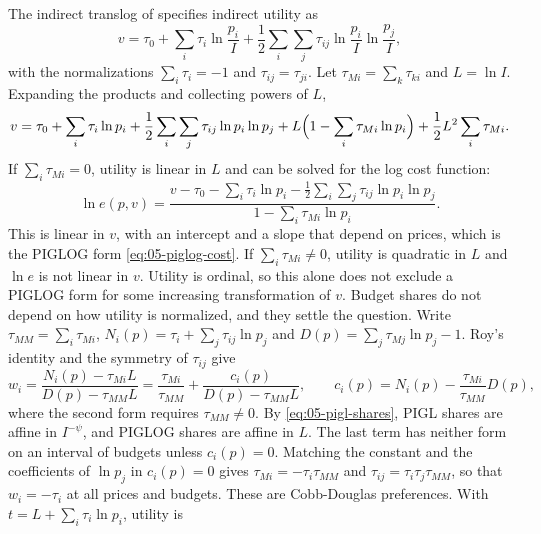 \begin{remark}\label{rem:05-translog-piglog}
The indirect translog of \citet{ChristensenJorgensonLau1975} specifies indirect utility as
\begin{equation*}
  v = \tau_0 + \sum_i \tau_i \ln\frac{p_i}{I}
      + \frac{1}{2}\sum_i\sum_j \tau_{ij}\ln\frac{p_i}{I}\ln\frac{p_j}{I},
\end{equation*}
with the normalizations $\sum_i \tau_i = -1$ and $\tau_{ij} = \tau_{ji}$. Let $\tau_{Mi} = \sum_k
\tau_{ki}$ and $L = \ln I$. Expanding the products and collecting powers of $L$,
\begin{equation*}
  v = \tau_0 + \sum_i \tau_i \ln p_i + \frac{1}{2}\sum_i\sum_j \tau_{ij}\ln p_i \ln p_j
      + L\Bigl(1 - \sum_i \tau_{Mi}\ln p_i\Bigr) + \frac{1}{2}L^2 \sum_i \tau_{Mi} .
\end{equation*}
If $\sum_i \tau_{Mi} = 0$, utility is linear in $L$ and can be solved for the log cost function:
\begin{equation*}
  \ln e(p, v) = \frac{v - \tau_0 - \sum_i \tau_i \ln p_i - \frac{1}{2}\sum_i\sum_j\tau_{ij}\ln p_i\ln p_j}
                     {1 - \sum_i \tau_{Mi}\ln p_i} .
\end{equation*}
This is linear in $v$, with an intercept and a slope that depend on prices, which is the PIGLOG form
\eqref{eq:05-piglog-cost}. If $\sum_i\tau_{Mi} \neq 0$, utility is quadratic in $L$ and $\ln e$ is not
linear in $v$. Utility is ordinal, so this alone does not exclude a PIGLOG form for some increasing
transformation of $v$. Budget shares do not depend on how utility is normalized, and they settle the
question. Write $\tau_{MM} = \sum_i\tau_{Mi}$, $N_i(p) = \tau_i + \sum_j\tau_{ij}\ln p_j$ and $D(p) =
\sum_j\tau_{Mj}\ln p_j - 1$. Roy's identity and the symmetry of $\tau_{ij}$ give
\begin{equation*}
  w_i = \frac{N_i(p) - \tau_{Mi}L}{D(p) - \tau_{MM}L}
      = \frac{\tau_{Mi}}{\tau_{MM}} + \frac{c_i(p)}{D(p) - \tau_{MM}L},
  \qquad c_i(p) = N_i(p) - \frac{\tau_{Mi}}{\tau_{MM}}D(p),
\end{equation*}
where the second form requires $\tau_{MM} \neq 0$. By \eqref{eq:05-pigl-shares}, PIGL shares are affine
in $I^{-\psi}$, and PIGLOG shares are affine in $L$. The last term has neither form on an interval of
budgets unless $c_i(p) = 0$. Matching the constant and the coefficients of $\ln p_j$ in $c_i(p) = 0$ gives
$\tau_{Mi} = -\tau_i\tau_{MM}$ and $\tau_{ij} = \tau_i\tau_j\tau_{MM}$, so that $w_i = -\tau_i$ at all
prices and budgets. These are Cobb-Douglas preferences. With $t = L + \sum_i\tau_i\ln p_i$, utility is

\end{remark}
